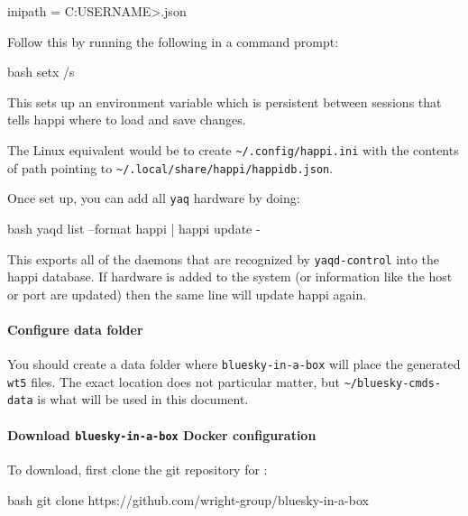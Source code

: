 \begin{codefragment}{ini}\noop
[DEFAULT]
path = C:\Users\<USERNAME>\AppData\Local\happi\happi\happidb.json
\end{codefragment}

Follow this by running the following in a command prompt:

\begin{codefragment}{bash}
setx /s %
\end{codefragment}

This sets up an environment variable which is persistent between sessions that tells happi where to load and save changes.

The Linux equivalent would be to create \nolinkurl{~/.config/happi.ini} with the contents of path pointing to \nolinkurl{~/.local/share/happi/happidb.json}.

Once set up, you can add all \texttt{yaq} hardware by doing:

\begin{codefragment}{bash}
yaqd list --format happi | happi update -
\end{codefragment}

This exports all of the daemons that are recognized by \texttt{yaqd-control} into the happi database.
If hardware is added to the system (or information like the host or port are updated) then the same line will update happi again.

\paragraph{Configure data folder}

You should create a data folder where \texttt{bluesky-in-a-box} will place the generated \texttt{wt5} files.
The exact location does not particular matter, but \nolinkurl{~/bluesky-cmds-data} is what will be used in this document.

\paragraph{Download \texttt{bluesky-in-a-box} Docker configuration}

To download, first clone the git repository for \biab:

\begin{codefragment}{bash}
git clone https://github.com/wright-group/bluesky-in-a-box
\end{codefragment}

